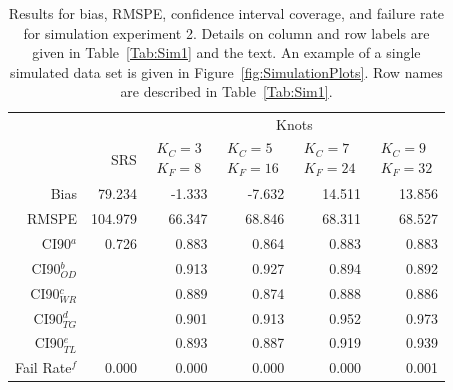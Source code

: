 \documentclass[12pt, titlepage]{article}\usepackage[]{graphicx}\usepackage[]{color}
\begin{document}

\footnotesize
\begin{table}[ht]
  \caption{Results for bias, RMSPE, confidence interval coverage, and failure rate for simulation experiment 2. Details on column and row labels are given in Table~\ref{Tab:Sim1} and the text. An example of a single simulated data set is given in Figure~\ref{fig:SimulationPlots}. Row names are described in Table~\ref{Tab:Sim1}. \label{Tab:Sim2}}
\begin{center}
\begin{tabular}{rrrrrr}
  \hline
  \hline
	&  & \multicolumn{4}{c}{Knots} \\ 
 & SRS & $\begin{array}{c}K_C=3  \\ K_F=8 \end{array}$ & $\begin{array}{c}K_C=5  \\ K_F=16 \end{array}$ & $\begin{array}{c}K_C=7  \\ K_F=24 \end{array}$ & $\begin{array}{c}K_C=9  \\ K_F=32 \end{array}$ \\
  \hline
 Bias & 79.234 & -1.333 & -7.632 & 14.511 & 13.856 \\ 
  RMSPE & 104.979 & 66.347 & 68.846 & 68.311 & 68.527 \\ 
  CI90$^a$ & 0.726 & 0.883 & 0.864 & 0.883 & 0.883 \\ 
  CI90$_{OD}^b$ &  & 0.913 & 0.927 & 0.894 & 0.892 \\ 
  CI90$_{WR}^c$ &  & 0.889 & 0.874 & 0.888 & 0.886 \\ 
  CI90$_{TG}^d$ &  & 0.901 & 0.913 & 0.952 & 0.973 \\ 
  CI90$_{TL}^e$ &  & 0.893 & 0.887 & 0.919 & 0.939 \\ 
  Fail Rate$^f$ & 0.000 & 0.000 & 0.000 & 0.000 & 0.001 \\ 
  

   \hline
\end{tabular}
\end{center}
\end{table}

\end{document}

